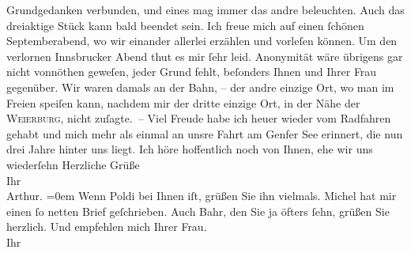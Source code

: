 \begin{ledgroupsized}[t]{13cm}
                    Grundgedanken verbunden, und eines mag immer das andre beleuchten. Auch das
                    dreiaktige Stück kann
                    bald beendet sein.\pend
           \pstart
           Ich freue mich auf einen ſchönen Septemberabend, wo wir einander allerlei
                    erzählen und vorleſen{\pb} können. Um den verlornen
                        Innsbrucker Abend thut es mir ſehr leid.
                    Anonymität wäre übrigens gar nicht vonnöthen geweſen, jeder Grund fehlt,
                    beſonders Ihnen und Ihrer Frau gegenüber. Wir waren damals an der Bahn, – der andre einzige Ort, wo man \strikeout{\textcolor{gray}{nie}} im Freien speiſen kann, nachdem mir der dritte einzige Ort, in der Nähe
                    der \textsc{Weierburg}, nicht zuſagte. –\pend
           \pstart
           Viel Freude habe ich heuer wieder vom Radfahren gehabt und mich mehr{\pb} als einmal an unsre Fahrt am Genfer See erinnert, die nun drei Jahre hinter uns
                    liegt.\pend
           \pstart
           Ich höre hoffentlich noch von Ihnen, ehe wir uns wiederſehn\pend
           \pstart
           Herzliche Grüße{\\[\baselineskip]}Ihr{\\[\baselineskip]}\spacefill\mbox{Arthur.}\pend
           \leftskip=0em{}\pstart
           \noindent{}Wenn Poldi bei Ihnen iſt, grüßen Sie
                        ihn vielmals. Michel hat mir einen ſo
                        netten Brief geſchrieben. Auch Bahr,
                        den Sie ja öfters ſehn, grüßen Sie herzlich. Und empfehlen mich Ihrer Frau.{\\}Ihr

\end{ledgroupsized}
